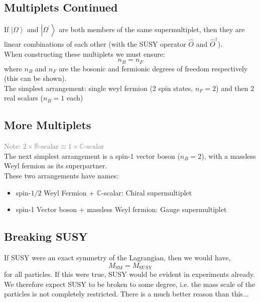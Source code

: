 \documentclass{beamer}
\begin{document}
\subsection{Multiplets Continued}
\begin{frame}{\insertsubsection}
  If $\left|\Omega\right>$ and $\left|\Omega^{\prime}\right>$ are both members of
  the same supermultiplet, then they are linear combinations of each other (with
  the SUSY operator $\hat{O}$ and $\hat{O}^{\dagger}$).
  \\ When constructing these multiplets we must ensure:
  \begin{equation*}
    n_{B}=n_{F}
  \end{equation*}
  where $n_{B}$ and $n_{F}$ are the bosonic and fermionic degrees of freedom
  respectively (this can be shown).
\\
  \alert{The simplest arrangement: single weyl fermion (2 spin states, $n_{F}=2$) and
  then 2 real scalars ($n_{B}=1$ each)}
\end{frame}

\subsection{More Multiplets}
\begin{frame}{\insertsubsection}
\textcolor{gray}{Note:
$2\times\mathbb{R}\textrm{-scalar}\equiv1\times\mathbb{C}\textrm{-scalar}$}\\
  The next simplest arrangement is a spin-1 vector boson ($n_{B}=2$), with a
  massless Weyl fermion as its superpartner.
  \\
  These two arrangements have names:
  \begin{itemize}
    \item spin-$1/2$ Weyl Fermion + $\mathbb{C}$-scalar: \alert{Chiral
    supermultiplet}
    \item spin-1 Vector boson + massless Weyl fermion: \alert{Gauge
    supermultiplet}
  \end{itemize}
\end{frame}

  
\subsection{Breaking SUSY}
\begin{frame}{\insertsubsection}
  If SUSY were an exact symmetry of the Lagrangian, then we would have,
  \begin{equation*}
    M_{\textrm{SM}}=M_{\textrm{SUSY}}
  \end{equation*}
  for all particles. If this were true, SUSY would be evident in experiments
  already.  We therefore expect SUSY to be broken to some degree, i.e. the mass
  scale of the particles is not completely restricted.
\alert{There is a much better reason than this...}
\end{frame}
\end{document}
